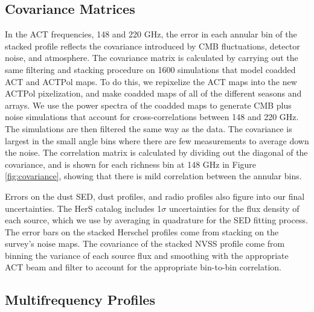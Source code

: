 \documentclass[a4paper,fleqn,usenatbib]{mnras}
\begin{document}
\subsection{Covariance Matrices}

In the ACT frequencies, 148 and 220 GHz, the error in each annular bin of the stacked profile reflects the covariance introduced by CMB fluctuations, detector noise, and atmosphere. 
The covariance matrix is calculated by carrying out the same filtering and stacking procedure on 1600 simulations that model coadded ACT and ACTPol maps. 
To do this, we repixelize the ACT maps into the new ACTPol pixelization, and make coadded maps of all of the different seasons and arrays. 
We use the power spectra of the coadded maps to generate CMB plus noise simulations that account for cross-correlations between 148 and 220 GHz.  
The simulations are then filtered the same way as the data. 
The covariance is largest in the small angle bins where there are few measurements to average down the noise. 
The correlation matrix is calculated by dividing out the diagonal of the covariance, and is shown for each richness bin at 148 GHz in Figure \ref{fig:covariance}, showing that there is mild correlation between the annular bins.  

Errors on the dust SED, dust profiles, and radio profiles also figure into our final uncertainties.  
The HerS catalog includes 1$\sigma$ uncertainties for the flux density of each source, which we use by averaging in quadrature for the SED fitting process. 
The error bars on the stacked Herschel profiles come from stacking on the survey's noise maps. 
The covariance of the stacked NVSS profile come from binning the variance of each source flux and smoothing with the appropriate ACT beam and filter to account for the appropriate bin-to-bin correlation.

\subsection{Multifrequency Profiles} \label{sec:multifreqprof}
\end{document}
